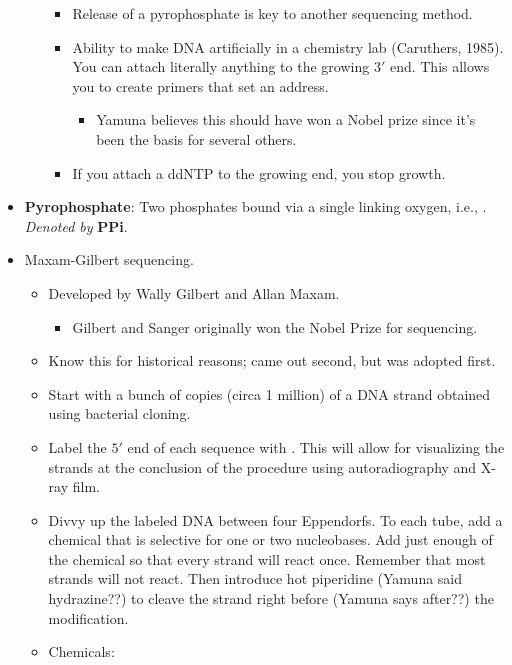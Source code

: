 \documentclass[../notes.tex]{subfiles}
\begin{document}
\begin{itemize}
\begin{itemize}
\begin{itemize}
            \item Release of a pyrophosphate is key to another sequencing method.
            \item Ability to make DNA artificially in a chemistry lab (Caruthers, 1985). You can attach literally anything to the growing $3'$ end. This allows you to create primers that set an address.
            \begin{itemize}
                \item Yamuna believes this should have won a Nobel prize since it's been the basis for several others.
            \end{itemize}
            \item If you attach a ddNTP to the growing end, you stop growth.
        \end{itemize}
    \end{itemize}
    \item \textbf{Pyrophosphate}: Two phosphates bound via a single linking oxygen, i.e., . \emph{Denoted by} \textbf{PPi}.
    \item Maxam-Gilbert sequencing.
    \begin{itemize}
        \item Developed by Wally Gilbert and Allan Maxam.
        \begin{itemize}
            \item Gilbert and Sanger originally won the Nobel Prize for sequencing.
        \end{itemize}
        \item Know this for historical reasons; came out second, but was adopted first.
        \item Start with a bunch of copies (circa 1 million) of a DNA strand obtained using bacterial cloning.
        \item Label the $5'$ end of each sequence with . This will allow for visualizing the strands at the conclusion of the procedure using autoradiography and X-ray film.
        \item Divvy up the labeled DNA between four Eppendorfs. To each tube, add a chemical that is selective for one or two nucleobases. Add just enough of the chemical so that every strand will react once. Remember that most strands will not react. Then introduce hot piperidine (Yamuna said hydrazine??) to cleave the strand right before (Yamuna says after??) the modification.
        \item Chemicals:
        \begin{align*}

\end{align*}
\end{itemize}
\end{itemize}
\end{document}
